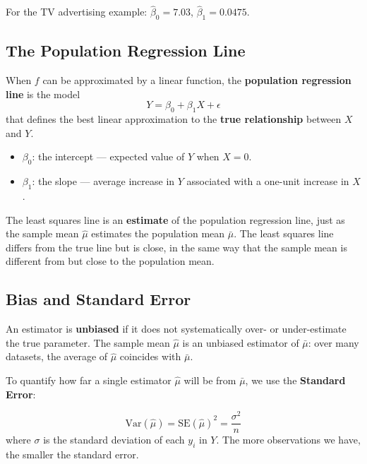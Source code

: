 \documentclass[11pt,a4paper]{article}
\theoremstyle{definition}
\theoremstyle{plain}
\theoremstyle{remark}
\begin{document}
For the TV advertising example: $\hat{\beta}_0 = 7.03$, $\hat{\beta}_1 = 0.0475$.

\subsection{The Population Regression Line}

\begin{tcolorbox}[colback=blue!5!white,colframe=blue!75!black,title=\textbf{Population Regression Line}]
When $f$ can be approximated by a linear function, the \textbf{population regression line} is the model
\[
    Y = \beta_0 + \beta_1 X + \epsilon
\]
that defines the best linear approximation to the \textbf{true relationship} between $X$ and $Y$.
\begin{itemize}
    \item $\beta_0$: the intercept — expected value of $Y$ when $X = 0$.
    \item $\beta_1$: the slope — average increase in $Y$ associated with a one-unit increase in $X$.
\end{itemize}
\end{tcolorbox}

The least squares line is an \textbf{estimate} of the population regression line, just as the sample mean $\hat{\mu}$ estimates the population mean $\bar{\mu}$. The least squares line differs from the true line but is close, in the same way that the sample mean is different from but close to the population mean.

\subsection{Bias and Standard Error}

An estimator is \textbf{unbiased} if it does not systematically over- or under-estimate the true parameter. The sample mean $\hat{\mu}$ is an unbiased estimator of $\bar{\mu}$: over many datasets, the average of $\hat{\mu}$ coincides with $\bar{\mu}$.

To quantify how far a single estimator $\hat{\mu}$ will be from $\bar{\mu}$, we use the \textbf{Standard Error}:

\begin{tcolorbox}[colback=blue!5!white,colframe=blue!75!black,title=\textbf{Standard Error}]
\[
    \mathrm{Var}(\hat{\mu}) = \mathrm{SE}(\hat{\mu})^2 = \frac{\sigma^2}{n}
\]
where $\sigma$ is the standard deviation of each $y_i$ in $Y$. The more observations we have, the smaller the standard error.
\end{tcolorbox}
\end{document}
